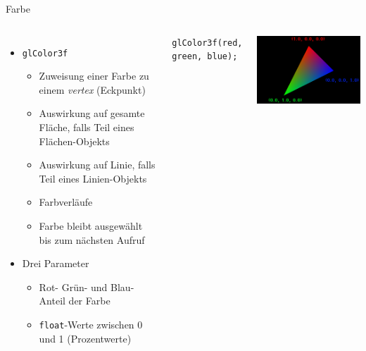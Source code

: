 
\begin{frame}[fragile]{Farbe}
%
\begin{columns}[T]
\begin{itemize}
\item \texttt{glColor3f}
	\begin{itemize}
	\item Zuweisung einer Farbe zu einem \emph{vertex} (Eckpunkt)
	\item Auswirkung auf gesamte Fläche, falls Teil eines Flächen-Objekts
	\item Auswirkung auf Linie, falls  Teil eines Linien-Objekts
	\item Farbverläufe
	\item Farbe bleibt ausgewählt bis zum nächsten Aufruf
	\end{itemize}
\item Drei Parameter
	\begin{itemize}
	\item Rot- Grün- und Blau-Anteil der Farbe
	\item \texttt{float}-Werte zwischen 0 und 1 (Prozentwerte)
	\end{itemize}
\end{itemize}
%
\begin{codebox}
\begin{verbatim}
glColor3f(red, green, blue);
\end{verbatim}
\end{codebox}
\includegraphics[width=\linewidth]{./gfx/GL-Tricolor}
\end{columns}
%
\end{frame}

